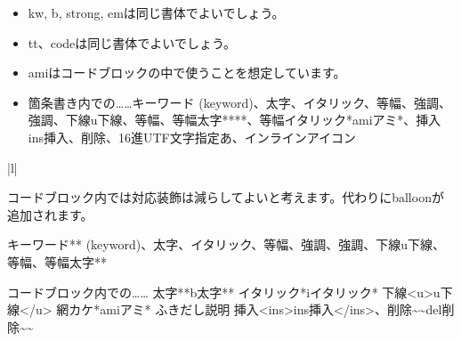 \begin{itemize}
\item kw, b, strong, emは同じ書体でよいでしょう。
\item tt、codeは同じ書体でよいでしょう。
\item amiはコードブロックの中で使うことを想定しています。
\end{itemize}


\begin{itemize}
\item 箇条書き内での……キーワード (keyword)、太字、イタリック、等幅、強調、強調、下線u下線、等幅、等幅太字****、等幅イタリック*amiアミ*、挿入ins挿入、削除、16進UTF文字指定あ、インラインアイコン
\end{itemize}

\begin{reviewtable}{|l|}
\hline
{} \\  \hline
\end{reviewtable}

コードブロック内では対応装飾は減らしてよいと考えます。代わりにballoonが追加されます。

キーワード** (keyword)、太字、イタリック、等幅、強調、強調、下線u下線、等幅、等幅太字**

\begin{reviewlistblock}
\begin{reviewemlist}
コードブロック内での……
太字**b太字**
イタリック*iイタリック*
下線\textless{}u\textgreater{}u下線\textless{}/u\textgreater{}
網カケ*amiアミ*    ふきだし説明
挿入\textless{}ins\textgreater{}ins挿入\textless{}/ins\textgreater{}、削除\textasciitilde{}\textasciitilde{}del削除\textasciitilde{}\textasciitilde{}
\end{reviewemlist}
\end{reviewlistblock}

